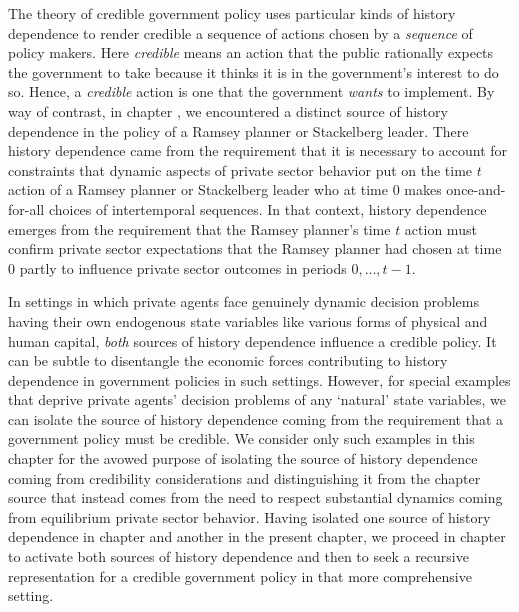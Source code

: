 The theory of credible government policy uses particular kinds of history dependence to render credible a  sequence of actions  chosen by  a {\it sequence\/}
of policy makers. Here {\it credible\/} means an action that the public rationally expects the government to take because it thinks it is in the government's interest  to do so.  Hence, a {\it credible\/}  action  is one that the  government  {\it wants\/} to implement.  By way of contrast, in chapter , we  encountered a distinct source of history dependence in the policy of a Ramsey planner or Stackelberg leader. There history dependence came from the requirement that it is necessary  to account for  constraints that dynamic aspects of  private sector behavior put on the time $t$ action of a Ramsey planner or Stackelberg leader who at time $0$  makes  once-and-for-all choices of intertemporal sequences.  In that context, history dependence emerges from the requirement that the Ramsey planner's time $t$ action  must confirm private sector expectations
 that the Ramsey planner had chosen  at  time $0$  partly  to influence private sector outcomes in periods $0, \ldots, t-1$.

In settings in which private agents face genuinely dynamic decision problems having their own endogenous state variables like various forms of physical and human capital, {\it both\/} sources of
history dependence influence a credible policy.  It can be subtle  to disentangle the economic forces contributing to history dependence in government
policies in such settings.     However, for  special  examples that  deprive private agents' decision problems of any `natural' state variables, we can isolate the source of history dependence coming from the requirement that a government policy  must be credible.  We consider only such examples  in this chapter
for the avowed purpose of isolating the source of history dependence coming from credibility considerations and distinguishing it from the
chapter 
source that instead comes  from the need to respect substantial  dynamics coming from equilibrium private sector behavior. Having isolated one source
of history dependence in chapter  and another in the present chapter, we proceed in chapter  to activate both
sources of history dependence and then to seek a recursive representation for a credible government policy in that more comprehensive setting.



